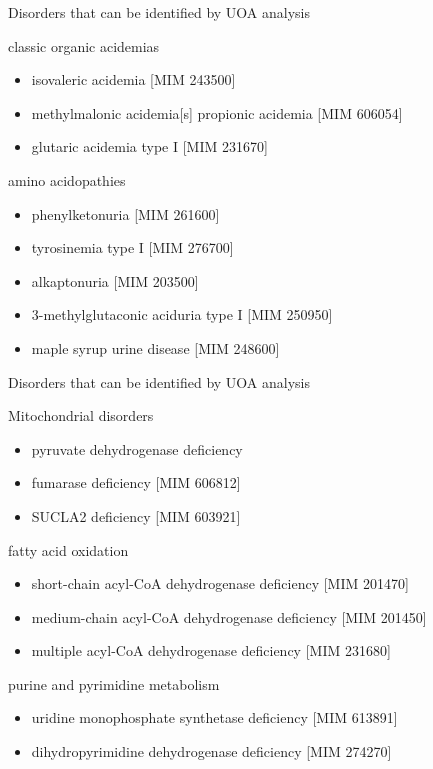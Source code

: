 \documentclass[presentation, smaller]{beamer}
\begin{document}
\begin{frame}[label={sec:orgheadline11}]{Disorders that can be identified by UOA analysis}
\begin{block}{classic organic acidemias}
\begin{itemize}
\item isovaleric acidemia [MIM 243500]
\item methylmalonic acidemia[s] propionic acidemia [MIM 606054]
\item glutaric acidemia type I [MIM 231670]
\end{itemize}
\end{block}
\begin{block}{amino acidopathies}
\begin{itemize}
\item phenylketonuria [MIM 261600]
\item tyrosinemia type I [MIM 276700]
\item alkaptonuria [MIM 203500]
\item 3-methylglutaconic aciduria type I [MIM 250950]
\item maple syrup urine disease [MIM 248600]
\end{itemize}
\end{block}
\end{frame}

\begin{frame}[label={sec:orgheadline12}]{Disorders that can be identified by UOA analysis}
\begin{block}{Mitochondrial disorders}
\begin{itemize}
\item pyruvate dehydrogenase deficiency
\item fumarase deficiency [MIM 606812]
\item SUCLA2 deficiency [MIM 603921]
\end{itemize}
\end{block}
\begin{block}{fatty acid oxidation}
\begin{itemize}
\item short-chain acyl-CoA dehydrogenase deficiency [MIM 201470]
\item medium-chain acyl-CoA dehydrogenase deficiency [MIM 201450]
\item multiple acyl-CoA dehydrogenase deficiency [MIM 231680]
\end{itemize}
\end{block}

\begin{block}{purine and pyrimidine metabolism}
\begin{itemize}
\item uridine monophosphate synthetase deficiency [MIM 613891]
\item dihydropyrimidine dehydrogenase deficiency [MIM 274270]
\end{itemize}
\end{block}
\end{frame}
\end{document}
